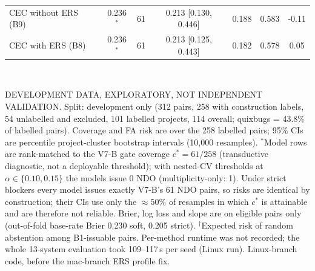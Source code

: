 \begin{table}[!t]
\begin{tabular}{|l|c|c|c|c|c|c|}
CEC without ERS (B9) & 0.236$^\ast$ & 61 & 0.213 [0.130, 0.446] & 0.188 & 0.583 & -0.11 \\
CEC with ERS (B8) & 0.236$^\ast$ & 61 & 0.213 [0.125, 0.443] & 0.182 & 0.578 & 0.05 \\
\hline
\end{tabular}
\\[2pt]
\parbox{\textwidth}{\scriptsize DEVELOPMENT DATA, EXPLORATORY, NOT INDEPENDENT VALIDATION. Split: development only (312 pairs, 258 with construction labels, 54 unlabelled and excluded, 101 labelled projects, 114 overall; quixbugs = 43.8\% of labelled pairs). Coverage and FA risk are over the 258 labelled pairs; 95\% CIs are percentile project-cluster bootstrap intervals (10{,}000 resamples). $^\ast$Model rows are rank-matched to the V7-B gate coverage $c^*=61/258$ (transductive diagnostic, not a deployable threshold); with nested-CV thresholds at $\alpha\in\{0.10,0.15\}$ the models issue 0 NDO (multiplicity-only: 1). Under strict blockers every model issues exactly V7-B's 61 NDO pairs, so risks are identical by construction; their CIs use only the ${\approx}50\%$ of resamples in which $c^*$ is attainable and are therefore not reliable. Brier, log loss and slope are on eligible pairs only (out-of-fold base-rate Brier 0.230 soft, 0.205 strict). $^\dagger$Expected risk of random abstention among B1-issuable pairs. Per-method runtime was not recorded; the whole 13-system evaluation took 109--117\,s per seed (Linux run). Linux-branch code, before the mac-branch ERS profile fix.}
\end{table}
